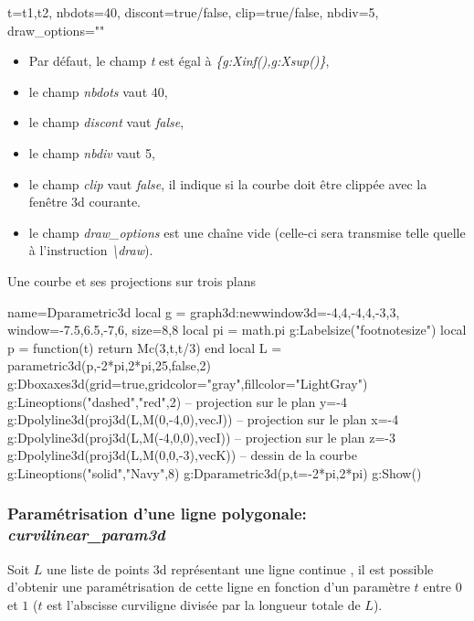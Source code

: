 \begin{itemize}
\begin{TeXcode}
 { t={t1,t2}, nbdots=40, discont=true/false, clip=true/false, nbdiv=5, draw_options="" }
\end{TeXcode}

  \begin{itemize}
      \item Par défaut, le champ \emph{t} est égal à \emph{\{g:Xinf(),g:Xsup()\}},
      \item le champ \emph{nbdots} vaut 40, 
      \item le champ \emph{discont} vaut \emph{false},
      \item le champ \emph{nbdiv} vaut 5,
      \item le champ \emph{clip} vaut \emph{false}, il indique si la courbe doit être clippée avec la fenêtre 3d courante.
      \item le champ \emph{draw\_options} est une chaîne vide (celle-ci sera transmise telle quelle à l'instruction \emph{\textbackslash draw}).
  \end{itemize}
\end{itemize} 

\begin{demo}{Une courbe et ses projections sur trois plans} 
\begin{luadraw}{name=Dparametric3d}
local g = graph3d:new{window3d={-4,4,-4,4,-3,3}, window={-7.5,6.5,-7,6}, size={8,8}}
local pi = math.pi
g:Labelsize("footnotesize")
local p = function(t) return Mc(3,t,t/3) end
local L = parametric3d(p,-2*pi,2*pi,25,false,2)
g:Dboxaxes3d({grid=true,gridcolor="gray",fillcolor="LightGray"})
g:Lineoptions("dashed","red",2)
-- projection sur le plan y=-4
g:Dpolyline3d(proj3d(L,{M(0,-4,0),vecJ}))
-- projection sur le plan x=-4
g:Dpolyline3d(proj3d(L,{M(-4,0,0),vecI}))
-- projection sur le plan z=-3
g:Dpolyline3d(proj3d(L,{M(0,0,-3),vecK}))
-- dessin de la courbe
g:Lineoptions("solid","Navy",8)
g:Dparametric3d(p,{t={-2*pi,2*pi}})
g:Show()
\end{luadraw}
\end{demo}

\subsubsection{Paramétrisation d'une ligne polygonale: \emph{curvilinear\_param3d}}
Soit $L$ une liste de points 3d représentant une ligne \og continue \fg, il est possible d'obtenir une paramétrisation de cette ligne en fonction d'un paramètre $t$ entre $0$ et $1$ ($t$ est l'abscisse curviligne divisée par la longueur totale de $L$).


